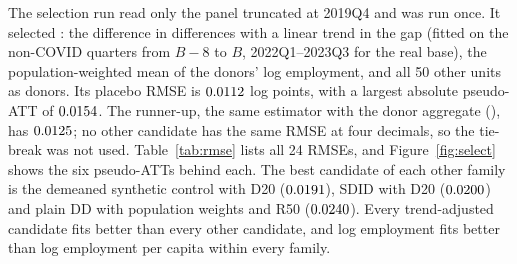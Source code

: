 The selection run read only the panel truncated at 2019Q4 and was run once. It selected
: the difference in differences with a linear trend in the gap (fitted on the
non-COVID quarters from $B-8$ to $B$, 2022Q1--2023Q3 for the real base), the population-weighted mean of the donors' log employment, and all
50 other units as donors. Its placebo RMSE is $0.0112$ log points, with a largest absolute
pseudo-ATT of $0.0154$. The runner-up, the same estimator with the donor aggregate
(), has $0.0125$; no other candidate has the same RMSE at four
decimals, so the tie-break was not used. Table~\ref{tab:rmse} lists all 24 RMSEs, and
Figure~\ref{fig:select} shows the six pseudo-ATTs behind each. The best candidate of each other
family is the demeaned synthetic control with D20 ($0.0191$), SDID with D20
($0.0200$) and plain DD with population weights and R50 ($0.0240$). Every
trend-adjusted candidate fits better than every other candidate, and log employment fits better
than log employment per capita within every family.

